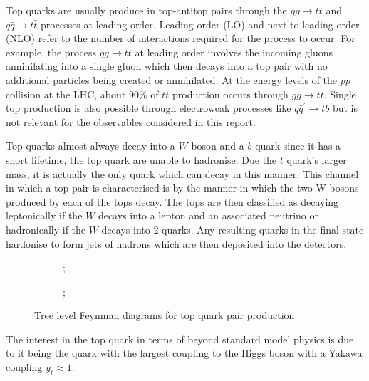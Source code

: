 \documentclass[a4paper,11pt]{article}
\begin{document}
Top quarks are usually produce in top-antitop pairs through the $gg\rightarrow t\bar{t}$ and $q\bar{q}\rightarrow t\bar{t}$ processes at leading order.
Leading order (LO) and next-to-leading order (NLO) refer to the number of interactions required for the process to occur.
For example, the process $gg\rightarrow t\bar{t}$ at leading order involves the incoming gluons annihilating into a single gluon which then decays into a top pair with no additional particles being created or annihilated.
At the energy levels of the $pp$ collision at the LHC, about 90\% of $t\bar{t}$ production occurs through $gg\rightarrow t\bar{t}$.
Single top production is also possible through electroweak processes like $q\bar{q}^{\prime}\rightarrow t\bar{b}$ but is not relevant for the observables considered in this report.

Top quarks almost always decay into a $W$ boson and a $b$ quark since it has a short lifetime, the top quark are unable to hadronise.
Due the $t$ quark's larger mass, it is actually the only quark which can decay in this manner.
This channel in which a top pair is characterised is by the manner in which the two W bosons produced by each of the tops decay.
The tops are then classified as decaying leptonically if the $W$ decays into a lepton and an associated neutrino or hadronically if the $W$ decays into 2 quarks.
Any resulting quarks in the final state hardonise to form jets of hadrons which are then deposited into the detectors.

\begin{figure}[htb]
    \centering
    \begin{subfigure}[b]{0.4\textwidth}
        \centering
        ;
    \end{subfigure}
    \hfill
    \begin{subfigure}[b]{0.4\textwidth}
        \centering
        ;
    \end{subfigure}
    \caption{Tree level Feynman diagrams for top quark pair production}
\end{figure}


\nocite{Thomson:2013zua}
The interest in the top quark in terms of beyond standard model physics is due to it being the quark with the largest coupling to the Higgs boson with a Yakawa coupling $y_{t} \approx 1$.
\end{document}
